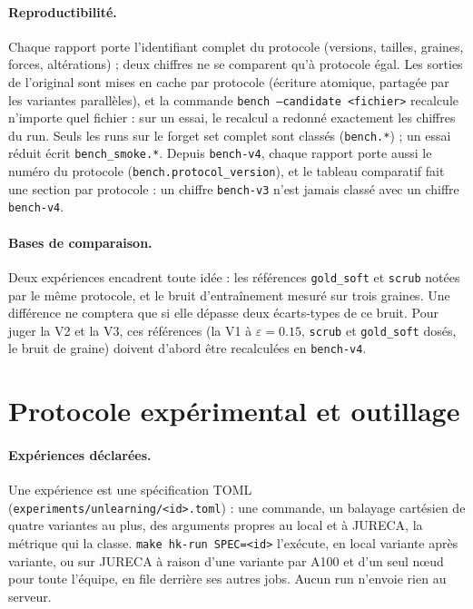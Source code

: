 \documentclass[11pt,a4paper]{article}
\newcommand{\code}[1]{\texttt{#1}}
\newcommand{\chemin}[1]{\nolinkurl{#1}}%
\begin{document}
\paragraph{Reproductibilité.} Chaque rapport porte l'identifiant complet du protocole (versions,
tailles, graines, forces, altérations) ; deux chiffres ne se comparent qu'à protocole égal. Les
sorties de l'original sont mises en cache par protocole (écriture atomique, partagée par les
variantes parallèles), et la commande \code{bench --candidate <fichier>} recalcule n'importe quel
fichier : sur un essai, le recalcul a redonné exactement les chiffres du run. Seuls les runs sur le
forget set complet sont classés (\code{bench.*}) ; un essai réduit écrit \code{bench\_smoke.*}.
Depuis \code{bench-v4}, chaque rapport porte aussi le numéro du protocole
(\code{bench.protocol\_version}), et le tableau comparatif fait une section par protocole : un
chiffre \code{bench-v3} n'est jamais classé avec un chiffre \code{bench-v4}.

\paragraph{Bases de comparaison.} Deux expériences encadrent toute idée : les références
\code{gold\_soft} et \code{scrub} notées par le même protocole, et le bruit d'entraînement mesuré
sur trois graines. Une différence ne comptera que si elle dépasse deux écarts-types de ce bruit.
Pour juger la V2 et la V3, ces références (la V1 à $\varepsilon=\num{0.15}$, \code{scrub} et
\code{gold\_soft} dosés, le bruit de graine) doivent d'abord être recalculées en \code{bench-v4}.

\section{Protocole expérimental et outillage}\label{sec:protocole}
\paragraph{Expériences déclarées.} Une expérience est une spécification TOML
(\chemin{experiments/unlearning/<id>.toml}) : une commande, un balayage cartésien de quatre
variantes au plus, des arguments propres au local et à JURECA, la métrique qui la classe.
\code{make hk-run SPEC=<id>} l'exécute, en local variante après variante, ou sur JURECA à raison
d'une variante par A100 et d'un seul nœud pour toute l'équipe, en file derrière ses autres jobs.
Aucun run n'envoie rien au serveur.
\end{document}
